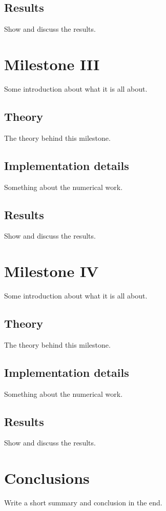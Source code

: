 \subsection{Results}
Show and discuss the results.

\section{Milestone III}
Some introduction about what it is all about.

\subsection{Theory}
The theory behind this milestone.

\subsection{Implementation details}
Something about the numerical work.

\subsection{Results}
Show and discuss the results.

\section{Milestone IV}
Some introduction about what it is all about.

\subsection{Theory}
The theory behind this milestone.

\subsection{Implementation details}
Something about the numerical work.

\subsection{Results}
Show and discuss the results.

\section{Conclusions}

Write a short summary and conclusion in the end. 

